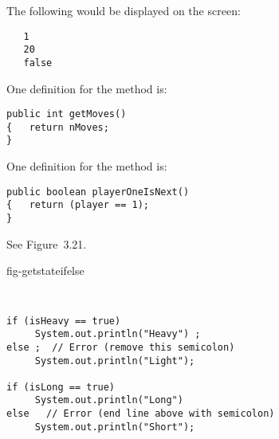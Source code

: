 \begin{ANS}
\item  The following would be displayed on the screen:

\begin{jjjlisting}
\begin{lstlisting}
   1
   20
   false
\end{lstlisting}
\end{jjjlisting}

\item  One definition for the method is:

\begin{jjjlisting}
\begin{lstlisting}
public int getMoves()
{   return nMoves;
}
\end{lstlisting}
\end{jjjlisting}

\item  One definition for the method is:

\begin{jjjlisting}
\begin{lstlisting}
public boolean playerOneIsNext()
{   return (player == 1);
}
\end{lstlisting}
\end{jjjlisting}

\item  See Figure~3.21.

 {fig-getstateifelse}



\item  \verb| |

\begin{jjjlisting}
\begin{lstlisting}
if (isHeavy == true)
     System.out.println("Heavy") ;
else ;  // Error (remove this semicolon)
     System.out.println("Light");

if (isLong == true)
     System.out.println("Long") 
else   // Error (end line above with semicolon)
     System.out.println("Short");
\end{lstlisting}
\end{jjjlisting}


\item  \verb| |


\end{ANS}
